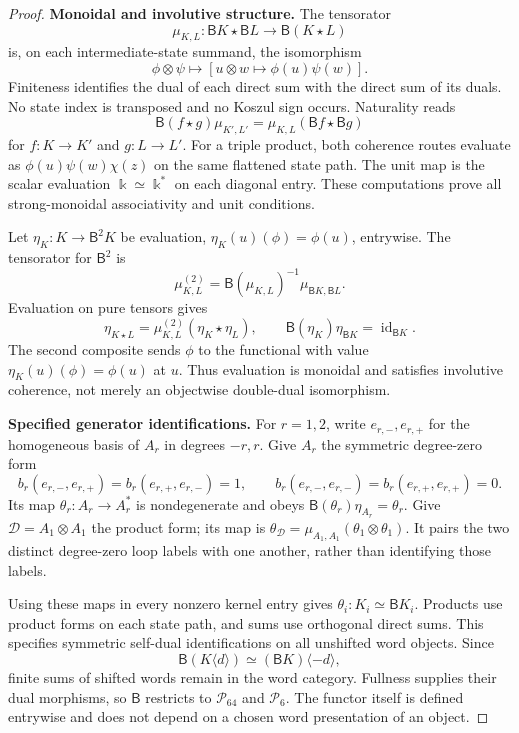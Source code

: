 \begin{proof}
\par\smallskip\noindent\textbf{Monoidal and involutive structure.}\quad
The tensorator
\[
 \mu_{K,L}:\mathsf B K\star\mathsf B L
                 \longrightarrow\mathsf B(K\star L)
\]
is, on each intermediate-state summand, the isomorphism
\[
 \phi\otimes\psi\longmapsto
 [u\otimes w\longmapsto\phi(u)\psi(w)].
\]
Finiteness identifies the dual of each direct sum with the
direct sum of its duals. No state index is transposed and no
Koszul sign occurs. Naturality reads
\[
 \mathsf B(f\star g)\mu_{K',L'}
       =\mu_{K,L}(\mathsf Bf\star\mathsf Bg)
\]
for $f:K\to K'$ and $g:L\to L'$.
For a triple product, both coherence routes evaluate as
$\phi(u)\psi(w)\chi(z)$ on the same flattened state path.
The unit map is the scalar evaluation $\Bbbk\simeq\Bbbk^*$
on each diagonal entry. These computations prove all
strong-monoidal associativity and unit conditions.

Let $\eta_K:K\to\mathsf B^2K$ be evaluation,
$\eta_K(u)(\phi)=\phi(u)$, entrywise. The tensorator for
$\mathsf B^2$ is
\[
 \mu^{(2)}_{K,L}
 =\mathsf B(\mu_{K,L})^{-1}
       \mu_{\mathsf B K,\mathsf B L}.
\]
Evaluation on pure tensors gives
\[
 \eta_{K\star L}=\mu^{(2)}_{K,L}(\eta_K\star\eta_L),
 \qquad
 \mathsf B(\eta_K)\eta_{\mathsf B K}
        =\operatorname{id}_{\mathsf B K}.
\]
The second composite sends $\phi$ to the functional with
value $\eta_K(u)(\phi)=\phi(u)$ at $u$.
Thus evaluation is monoidal and satisfies involutive
coherence, not merely an objectwise double-dual isomorphism.

\par\smallskip\noindent\textbf{Specified generator identifications.}\quad
For $r=1,2$, write $e_{r,-},e_{r,+}$ for the homogeneous
basis of $A_r$ in degrees $-r,r$. Give $A_r$ the symmetric
degree-zero form
\[
 b_r(e_{r,-},e_{r,+})=b_r(e_{r,+},e_{r,-})=1,
 \qquad b_r(e_{r,-},e_{r,-})=b_r(e_{r,+},e_{r,+})=0.
\]
Its map $\theta_r:A_r\to A_r^*$ is nondegenerate and obeys
$\mathsf B(\theta_r)\eta_{A_r}=\theta_r$.
Give $\mathcal D=A_1\otimes A_1$ the product form;
its map is $\theta_{\mathcal D}=\mu_{A_1,A_1}
(\theta_1\otimes\theta_1)$.
It pairs the two distinct degree-zero loop labels with
one another, rather than identifying those labels.

Using these maps in every nonzero kernel entry gives
$\theta_i:K_i\simeq\mathsf B K_i$.
Products use product forms on each state path, and sums
use orthogonal direct sums. This specifies symmetric
self-dual identifications on all unshifted word objects.
Since
\[
 \mathsf B(K\langle d\rangle)
     \simeq(\mathsf B K)\langle-d\rangle,
\]
finite sums of shifted words remain in the word category.
Fullness supplies their dual morphisms, so $\mathsf B$
restricts to $\mathcal P_{64}$ and $\mathcal P_6$.
The functor itself is defined entrywise and does not
depend on a chosen word presentation of an object.


\end{proof}

